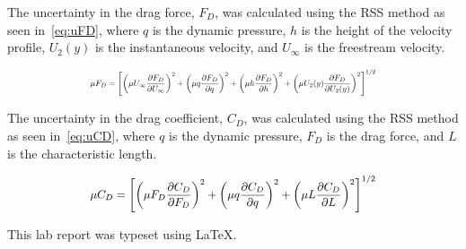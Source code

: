 \documentclass[journal,letterpaper]{IEEEtran}
\begin{document}
The uncertainty in the drag force, $F_D$, was calculated using the RSS method as seen in~\eqref{eq:uFD}, where $q$ is the dynamic pressure, $h$ is the height of the velocity profile, $U_2 (y)$ is the instantaneous velocity, and $U_\infty$ is the freestream velocity.

\begin{equation} \label{eq:uFD}
    \resizebox{227pt}{!}{$\displaystyle{\mu F_D = \left[\left(\mu U_\infty \frac{\partial F_D}{\partial U_\infty}\right)^2 + \left(\mu q \frac{\partial F_D}{\partial q}\right)^2 + \left(\mu h \frac{\partial F_D}{\partial h}\right)^2 + \left(\mu U_2 (y) \frac{\partial F_D}{\partial U_2 (y)}\right)^2\right]^{1/2}}$}
\end{equation}

The uncertainty in the drag coefficient, $C_D$, was calculated using the RSS method as seen in~\eqref{eq:uCD}, where $q$ is the dynamic pressure, $F_D$ is the drag force, and $L$ is the characteristic length.

\begin{equation} \label{eq:uCD}
    \resizebox{227pt}{!}{$\displaystyle{\mu C_D = \left[\left(\mu F_D \frac{\partial C_D}{\partial F_D}\right)^2 + \left(\mu q \frac{\partial C_D}{\partial q}\right)^2 + \left(\mu L \frac{\partial C_D}{\partial L}\right)^2\right]^{1/2}}$}
\end{equation}

\noindent
This lab report was typeset using \LaTeX.
\end{document}
